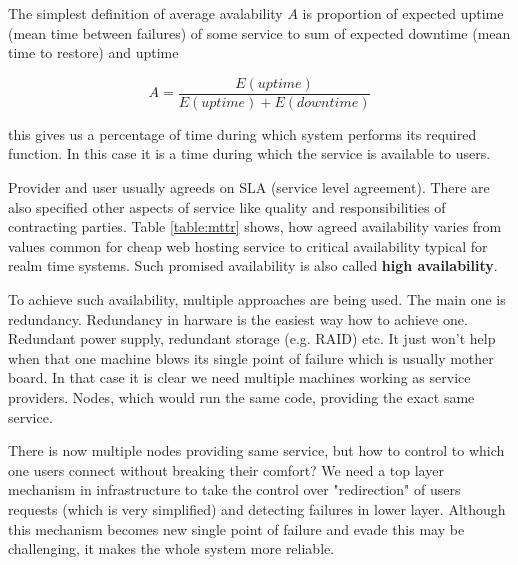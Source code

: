 \documentclass[
  master,
  biblatex,
  glossaries,
  index
]{kidiplom}
\begin{document}
The simplest definition of average avalability $A$ is proportion of expected uptime (mean time between failures) of some service to sum of expected downtime (mean time to restore) and uptime

$$A=\frac{E(uptime)}{E(uptime) + E(downtime)}$$

this gives us a percentage of time during which system performs its required function\cite{bib:reliability}. In this case it is a time during which the service is available to users.

Provider and user usually agreeds on SLA (service level agreement). There are also specified other aspects of service like quality and responsibilities of contracting parties. Table \ref{table:mttr} shows, how agreed availability varies from values common for cheap web hosting service to critical availability typical for realm time systems. Such promised availability is also called {\bf high availability}.

To achieve such availability, multiple approaches are being used. The main one is redundancy. Redundancy in harware is the easiest way how to achieve one. Redundant power supply, redundant storage (e.g. RAID) etc. It just won't help when that one machine blows its single point of failure which is usually mother board. In that case it is clear we need multiple machines working as service providers. Nodes, which would run the same code, providing the exact same service.

There is now multiple nodes providing same service, but how to control to which one users connect without breaking their comfort? We need a top layer mechanism in infrastructure to take the control over "redirection" of users requests (which is very simplified) and detecting failures in lower layer. Although this mechanism becomes new single point of failure and evade this may be challenging, it makes the whole system more reliable. %
\end{document}
